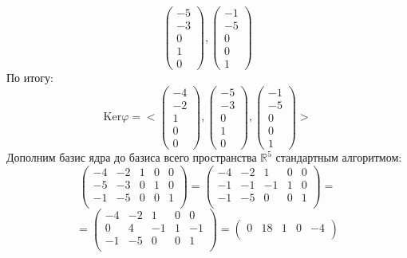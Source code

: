 \documentclass[a4paper,12pt]{article}
\begin{document}
\begin{enumerate}
\[\begin{pmatrix}
-5 \\ -3 \\ 0 \\ 1 \\ 0
\end{pmatrix}
,
\begin{pmatrix}
-1 \\ -5 \\ 0 \\ 0 \\ 1
\end{pmatrix}
\]
По итогу:
\[
\text{Ker} \varphi = 
<
\begin{pmatrix}
-4 \\ -2 \\ 1 \\ 0 \\ 0
\end{pmatrix}
,
\begin{pmatrix}
-5 \\ -3 \\ 0 \\ 1 \\ 0
\end{pmatrix}
,
\begin{pmatrix}
-1 \\ -5 \\ 0 \\ 0 \\ 1
\end{pmatrix}
>
\]
Дополним базис ядра до базиса всего пространства $\mathbb{R}^5$ стандартным алгоритмом:
\[
\begin{pmatrix}
-4 & -2 & 1 & 0 & 0 \\
-5 & -3 & 0 & 1 & 0 \\
-1 & -5 & 0 & 0 & 1 \\
\end{pmatrix}
=
\begin{pmatrix}
-4 & -2 & 1 & 0 & 0 \\
-1 & -1 & -1 & 1 & 0 \\
-1 & -5 & 0 & 0 & 1 \\
\end{pmatrix}
=
\]
\[
=
\begin{pmatrix}
-4 & -2 & 1 & 0 & 0  \\
0 & 4 & -1 & 1 & -1  \\
-1 & -5 & 0 & 0 & 1 \\
\end{pmatrix}
=
\begin{pmatrix}
0 & 18 & 1 & 0 & -4 \\

\end{pmatrix}\]
\end{enumerate}
\end{document}
